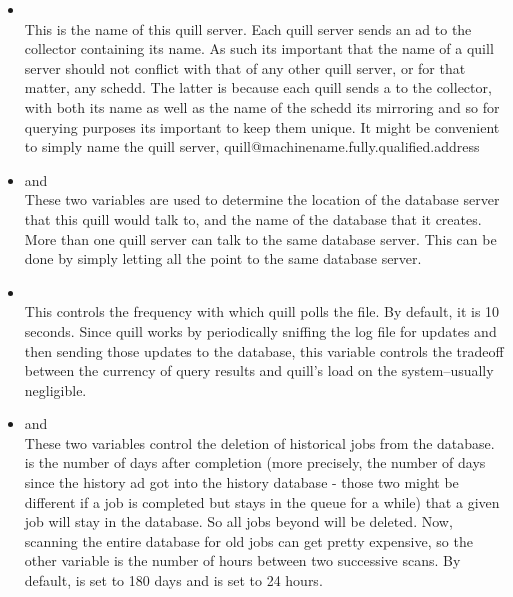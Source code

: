 \begin{enumerate}
\begin{itemize}
\item {}\\
This is the name of this quill server.  Each quill server sends an ad to
the collector containing its name.  As such its important that the name
of a quill server should not conflict with that of any other quill server,
or for that matter, any schedd.  The latter is because each quill sends a
 to the collector, with both its name as well as the name 
of the schedd its mirroring and so for querying purposes its important to keep 
them unique. It might be convenient to simply name the quill server, 
quill@machinename.fully.qualified.address

\item {} and \\
These two variables are used to determine the location of the database
server that this quill would talk to, and the name of the database that
it creates.  More than one quill server can talk to the same database
server.  This can be done by simply letting all the 
 point to the same database server.


\item {}\\
This controls the frequency with which quill polls the
 file.  By default, it is 10 seconds.  Since quill
works by periodically sniffing the log file for updates and then sending
those updates to the database, this variable controls the tradeoff between
the currency of query results and quill's load on the system--usually
negligible.

\item {} and 
		\\
These two variables control the deletion of historical jobs from the
database.   is the number of days
after completion (more precisely, the number of days since the history ad got 
into the history database - those two might be different if a job is completed 
but stays in the queue for a while) that a given job will stay in the database.  
So all jobs beyond  will be deleted.  Now,
scanning the entire database for old jobs can get pretty expensive,
so the other variable 
is the number of hours between two successive scans.  By default,
 is set to 180 days and
 is set to 24 hours.


\end{itemize}
\end{enumerate}
